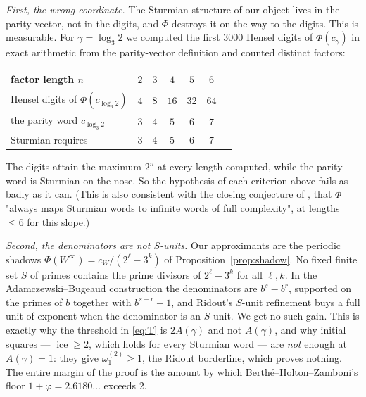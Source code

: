 \documentclass[11pt,reqno]{amsart}
\theoremstyle{plain}
\theoremstyle{definition}
\DeclareMathOperator{\ice}{ice}
\newcommand{\PH}{\Phi}
\newcommand{\Av}{A(\gamma)}
\newcommand{\om}{\omega_1^{(2)}}
\begin{document}
\emph{First, the wrong coordinate.} The Sturmian structure of our object lives in the parity vector,
not in the digits, and $\PH$ destroys it on the way to the digits. This is measurable. For
$\gamma=\log_3 2$ we computed the first $3000$ Hensel digits of $\PH(c_\gamma)$ in exact arithmetic
from the parity-vector definition and counted distinct factors:

\begin{center}
\begin{tabular}{lcccccl}
\toprule
factor length $n$ & $2$ & $3$ & $4$ & $5$ & $6$ \\
\midrule
Hensel digits of $\PH(c_{\log_3 2})$ & $4$ & $8$ & $16$ & $32$ & $64$ \\
the parity word $c_{\log_3 2}$       & $3$ & $4$ & $5$  & $6$  & $7$  \\
Sturmian requires                    & $3$ & $4$ & $5$  & $6$  & $7$  \\
\bottomrule
\end{tabular}
\end{center}

\noindent
The digits attain the maximum $2^n$ at every length computed, while the parity word is Sturmian on
the nose. So the hypothesis of each criterion above fails as badly as it can. (This is also consistent with
the closing conjecture of \cite{LS09}, that $\PH$ "always maps Sturmian words to infinite words of
full complexity", at lengths $\le6$ for this slope.)

\emph{Second, the denominators are not $S$-units.} Our approximants are the periodic shadows
$\PH(W^\infty)=c_W/(2^{\ell}-3^{k})$ of Proposition~\ref{prop:shadow}. No fixed finite set $S$ of
primes contains the prime divisors of $2^{\ell}-3^{k}$ for all $\ell,k$. In the Adamczewski--Bugeaud
construction the denominators are $b^{s}-b^{r}$, supported on the primes of $b$ together with
$b^{s-r}-1$, and Ridout's $S$-unit refinement buys a full unit of exponent when the denominator is
an $S$-unit. We get no such gain. This is exactly why the threshold in \eqref{eq:T} is $2\Av$ and
not $\Av$, and why initial squares --- $\ice\ge2$, which holds for every Sturmian word
\cite[Theorem 1]{ADQZ2001} --- are \emph{not} enough at $\Av=1$: they give $\om\ge1$, the Ridout
borderline, which proves nothing. The entire margin of the proof is the amount by which
Berth\'e--Holton--Zamboni's floor $1+\varphi=2.6180\ldots$ exceeds $2$.
\end{document}
